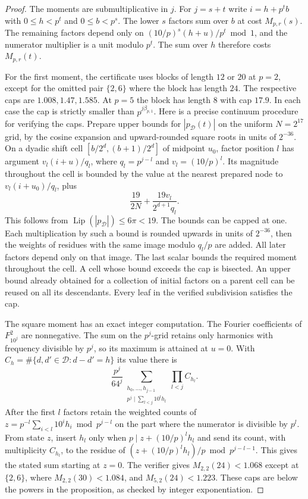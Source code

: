 \documentclass[11pt,a4paper]{article}
\theoremstyle{paperplain}
\numberwithin{equation}{section}
\begin{document}
\begin{proof}
The moments are submultiplicative in \(j\). For \(j=s+t\)
write \(i=h+p^t b\) with \(0\le h<p^t\) and \(0\le b<p^s\).
The lower \(s\) factors sum over \(b\) at cost \(M_{p,r}(s)\).
The remaining factors depend only on
\((10/p)^s(h+u)/p^t\bmod1\), and the numerator multiplier
is a unit modulo \(p^t\). The sum over \(h\) therefore costs
\(M_{p,r}(t)\).

For the first moment, the certificate uses blocks of length \(12\)
or \(20\) at \(p=2\), except for the omitted pair \(\{2,6\}\)
where the block has length \(24\). The respective caps are
\(1.008,1.47,1.585\). At \(p=5\) the block has length \(8\)
with cap \(17.9\). In each case the cap is strictly smaller
than \(p^{j\beta_{p,1}}\). Here is a precise continuum
procedure for verifying the caps. Prepare upper bounds for
\(|p_{\mathcal D}(t)|\) on the uniform \(N=2^{17}\) grid, by the cosine
expansion and upward-rounded square roots in units of \(2^{-36}\).
On a dyadic shift cell \([b/2^d,(b+1)/2^d]\) of midpoint \(u_0\),
factor position \(l\) has argument \(v_l(i+u)/q_l\), where
\(q_l=p^{j-l}\) and \(v_l=(10/p)^l\). Its magnitude throughout the
cell is bounded by the value at the nearest prepared node to
\(v_l(i+u_0)/q_l\), plus
\[
 \frac{19}{2N}+\frac{19v_l}{2^{d+1}q_l}.
\]
This follows from \(\operatorname{Lip}(|p_{\mathcal D}|)\le6\pi<19\).
The bounds can be capped at one. Each multiplication by such a
bound is rounded upwards in units of \(2^{-36}\), then the
weights of residues with the same image modulo \(q_l/p\) are
added. All later factors depend only on that image. The last
scalar bounds the required moment throughout the cell. A cell
whose bound exceeds the cap is bisected. An upper bound
already obtained for a collection of initial factors on a
parent cell can be reused on all its descendants. Every leaf
in the verified subdivision satisfies the cap.

The square moment has an exact integer computation. The Fourier
coefficients of \(F_{10^j}^2\) are nonnegative. The sum on the
\(p^j\)-grid retains only harmonics with frequency divisible by
\(p^j\), so its maximum is attained at \(u=0\). With
\(C_h=\#\{d,d'\in\mathcal D:d-d'=h\}\) its value there is
\[
 \frac{p^j}{64^j}
 \sum_{\substack{h_0,\ldots,h_{j-1}\\
              p^j\mid \sum_{l<j}10^l h_l}}
 \prod_{l<j} C_{h_l}.
\]
After the first \(l\) factors retain the weighted counts of
\(z=p^{-l}\sum_{i<l}10^i h_i\bmod p^{j-l}\) on the part
where the numerator is divisible by \(p^l\). From state \(z\),
insert \(h_l\) only when \(p\mid z+(10/p)^l h_l\) and send
its count, with multiplicity \(C_{h_l}\), to the residue of
\((z+(10/p)^l h_l)/p\bmod p^{j-l-1}\). This gives the stated
sum starting at \(z=0\). The verifier gives \(M_{2,2}(24)<1.068\)
except at \(\{2,6\}\), where \(M_{2,2}(30)<1.084\), and
\(M_{5,2}(24)<1.223\). These caps are below the powers in
the proposition, as checked by integer exponentiation.


\end{proof}
\end{document}
